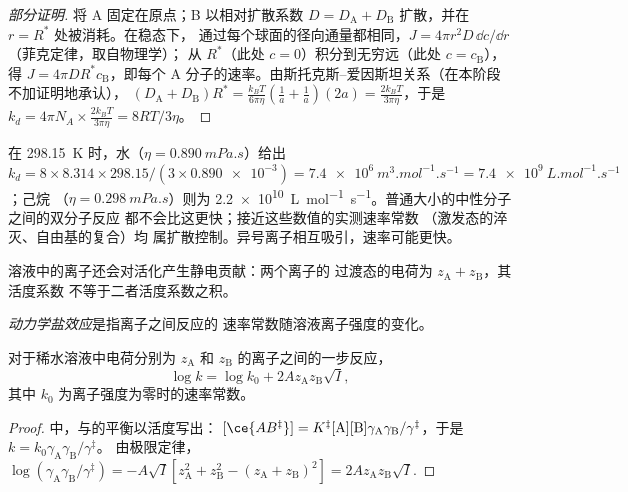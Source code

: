 \begin{proof}[部分证明]
将 A 固定在原点；B 以相对扩散系数 $D =
D_{\mathrm A} + D_{\mathrm B}$ 扩散，并在 $r = R^*$ 处被消耗。在稳态下，
通过每个球面的径向通量都相同，$J = 4\pi r^2D\,\dd c/\dd r$（菲克定律，取自物理学）；
从 $R^*$（此处 $c = 0$）积分到无穷远（此处 $c = c_{\mathrm B}$），
得 $J = 4\pi DR^*c_{\mathrm B}$，即每个 A 分子的速率。由斯托克斯–爱因斯坦关系（在本阶段不加证明地承认），
$(D_{\mathrm A} + D_{\mathrm B})R^* = \frac{k_BT}{6\pi\eta}(\frac{1}{a} + \frac1a)(2a) = \frac{2k_BT}{3\pi\eta}$，于是 $k_d = 4\pi N_A \times
\frac{2k_BT}{3\pi\eta} = 8RT/3\eta$。
\end{proof}

\begin{example}[水和己烷中的速率上限]\label{ex:b3:rate-theories:speed-limit}
在 \qty{298.15}{K} 时，水（$\eta = \qty{0.890}{mPa.s}$）给出 $k_d = 8 \times 8.314 \times
298.15/(3 \times \num{0.890e-3}) = \qty{7.4e6}{m^3.mol^{-1}.s^{-1}} = \qty{7.4e9}{L.mol^{-1}.s^{-1}}$；己烷
（$\eta = \qty{0.298}{mPa.s}$）则为 \qty{2.2e10}{L.mol^{-1}.s^{-1}}。普通大小的中性分子之间的双分子反应
都不会比这更快；接近这些数值的实测速率常数
（激发态的淬灭、自由基的复合）均
属扩散控制。异号离子相互吸引，速率可能更快。
\end{example}

溶液中的离子还会对活化产生静电贡献：两个离子的
过渡态的电荷为 $z_{\mathrm A} + z_{\mathrm B}$，其活度系数
不等于二者活度系数之积。

\begin{definition}[动力学盐效应]\label{def:b3:rate-theories:salt}
\emph{动力学盐效应}是指离子之间反应的
速率常数随溶液离子强度的变化。
\end{definition}

\begin{proposition}\label{prop:b3:rate-theories:bronsted-bjerrum}
对于稀水溶液中电荷分别为 $z_{\mathrm A}$ 和 $z_{\mathrm B}$ 的离子之间的一步反应，
\[
  \log k = \log k_0 + 2Az_{\mathrm A}z_{\mathrm B}\sqrt I,
\]
其中 $k_0$ 为离子强度为零时的速率常数。
\end{proposition}

\begin{proof}
中，与的平衡以活度写出：
$[\ce{AB^{\ddagger}}] = K^{\ddagger}[\mathrm A][\mathrm B]\gamma_{\mathrm A}\gamma_{\mathrm B}/\gamma^{\ddagger}$，于是 $k = k_0\gamma_{\mathrm A}\gamma_{\mathrm B}/\gamma^{\ddagger}$。
由极限定律，$\log(\gamma_{\mathrm A}\gamma_{\mathrm B}/\gamma^{\ddagger}) = -A\sqrt I[z_{\mathrm A}^2 + z_{\mathrm B}^2 - (z_{\mathrm A} + z_{\mathrm B})^2] =
2Az_{\mathrm A}z_{\mathrm B}\sqrt I$.
\end{proof}

